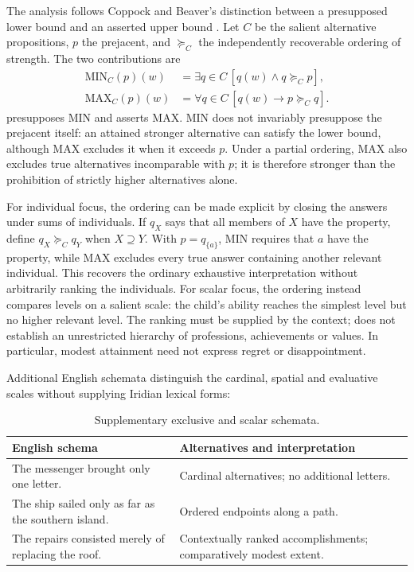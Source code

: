The analysis follows Coppock and Beaver's distinction between a presupposed
lower bound and an asserted upper bound
\cite[§2.3, pp.~392--395]{coppockbeaver2014}. Let $C$ be the salient
alternative propositions, $p$ the prejacent, and $\succeq_C$ the independently
recoverable ordering of strength. The two contributions are
\[
\begin{aligned}
\mathrm{MIN}_C(p)(w)
  &=\exists q\in C\,[q(w)\wedge q\succeq_C p],\\
\mathrm{MAX}_C(p)(w)
  &=\forall q\in C\,[q(w)\rightarrow p\succeq_C q].
\end{aligned}
\]
 presupposes MIN and asserts MAX. MIN does not invariably
presuppose the prejacent itself: an attained stronger alternative can satisfy
the lower bound, although MAX excludes it when it exceeds $p$. Under a partial
ordering, MAX also excludes true alternatives incomparable with $p$; it is
therefore stronger than the prohibition of strictly higher alternatives alone.

For individual focus, the ordering can be made explicit by closing the
answers under sums of individuals. If $q_X$ says that all members of $X$ have
the property, define $q_X\succeq_C q_Y$ when $X\supseteq Y$. With
$p=q_{\{a\}}$, MIN requires that $a$ have the property, while MAX excludes
every true answer containing another relevant individual. This recovers the
ordinary exhaustive interpretation without arbitrarily ranking the individuals.
For scalar focus, the ordering instead compares levels on a salient scale:
the child's ability reaches the simplest level but no higher relevant level.
The ranking must be supplied by the context;  does not establish
an unrestricted hierarchy of professions, achievements or values. In particular,
modest attainment need not express regret or disappointment.

Additional English schemata distinguish the cardinal, spatial and evaluative
scales without supplying Iridian lexical forms:
\begin{table}[ht]
\footnotesize
\caption{Supplementary exclusive and scalar schemata.}
\label{tab:kamo-supplementary-schemata}
\begin{tabularx}{\textwidth}{L L}
\toprule
English schema & Alternatives and interpretation \\
\midrule
The messenger brought only one letter. & Cardinal alternatives; no additional letters. \\
The ship sailed only as far as the southern island. & Ordered endpoints along a path. \\
The repairs consisted merely of replacing the roof. & Contextually ranked accomplishments; comparatively modest extent. \\
\bottomrule
\end{tabularx}
\end{table}

